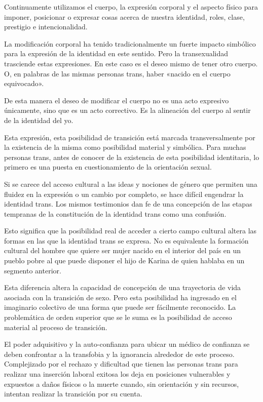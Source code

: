 Continuamente utilizamos el cuerpo, la expresión corporal y el aspecto físico
para imponer, posicionar o expresar cosas acerca de nuestra identidad, roles,
clase, prestigio e intencionalidad.

La modificación corporal ha tenido tradicionalmente un fuerte impacto simbólico
para la expresión de la identidad en este sentido. Pero la transexualidad
trasciende estas expresiones. En este caso es el deseo mismo de tener otro
cuerpo. O, en palabras de las mismas personas trans, haber «nacido en el cuerpo
equivocado».

De esta manera el deseo de modificar el cuerpo no es una acto expresivo
únicamente, sino que es un acto correctivo. Es la alineación del cuerpo al
sentir de la identidad del yo.

Esta expresión, esta posibilidad de transición está marcada transversalmente por
la existencia de la misma como posibilidad material y simbólica. Para muchas
personas trans, antes de conocer de la existencia de esta posibilidad
identitaria, lo primero es una puesta en cuestionamiento de la orientación
sexual.

Si se carece del acceso cultural a las ideas y nociones de género que permiten
una fluidez en la expresión o un cambio por completo, se hace difícil engendrar
la identidad trans. Los mismos testimonios dan fe de una concepción de las
etapas tempranas de la constitución de la identidad trans como una confusión.

Esto significa que la posibilidad real de acceder a cierto campo cultural altera
las formas en las que la identidad trans se expresa. No es equivalente la
formación cultural del hombre que quiere ser mujer nacido en el interior del
país en un pueblo pobre al que puede disponer el hijo de Karina de quien hablaba
en un segmento anterior.

Esta diferencia altera la capacidad de concepción de una trayectoria de vida
asociada con la transición de sexo. Pero esta posibilidad ha ingresado en el
imaginario colectivo de una forma que puede ser fácilmente reconocido. La
problemática de orden superior que se le suma es la posibilidad de acceso
material al proceso de transición.

El poder adquisitivo y la auto-confianza para ubicar un médico de confianza se
deben confrontar a la transfobia y la ignorancia alrededor de este proceso.
Complejizado por el rechazo y dificultad que tienen las personas trans para
realizar una inserción laboral exitosa los deja en posiciones vulnerables y
expuestos a daños físicos o la muerte cuando, sin orientación y sin recursos,
intentan realizar la transición por su cuenta.

